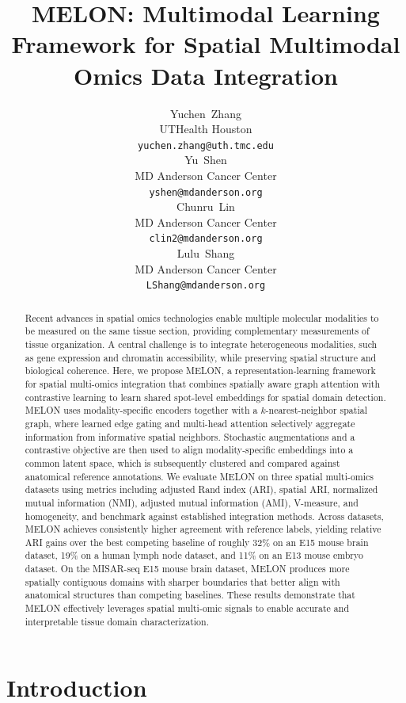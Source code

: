 \documentclass{article}
\title{MELON: Multimodal Learning Framework for Spatial Multimodal Omics Data Integration}
\author{%
  Yuchen~Zhang \\
  UTHealth Houston \\
  \texttt{yuchen.zhang@uth.tmc.edu} \\
  \And
  Yu~Shen \\
  MD Anderson Cancer Center \\
  \texttt{yshen@mdanderson.org} \\
  \AND
  Chunru~Lin \\
  MD Anderson Cancer Center \\
  \texttt{clin2@mdanderson.org} \\
  \And
  Lulu~Shang \\
  MD Anderson Cancer Center \\
  \texttt{LShang@mdanderson.org} \\
}
\theoremstyle{plain}
\theoremstyle{definition}
\begin{document}
\maketitle

\begin{abstract}
  Recent advances in spatial omics technologies enable multiple molecular modalities to be measured on the same tissue section, providing
  complementary measurements of tissue organization. A central challenge is to integrate heterogeneous modalities, such as gene expression and chromatin accessibility, while preserving spatial structure and biological coherence. Here, we propose MELON, a representation-learning framework for spatial multi-omics integration that combines spatially aware graph attention with contrastive learning to learn shared spot-level embeddings for spatial domain detection. MELON uses modality-specific encoders together with a $k$-nearest-neighbor spatial graph, where learned edge gating and multi-head attention selectively aggregate information from informative spatial neighbors. Stochastic
  augmentations and a contrastive objective are then used to align modality-specific embeddings into a common latent space, which is subsequently clustered and compared against anatomical reference annotations. We evaluate MELON on three spatial multi-omics datasets using metrics including adjusted Rand index (ARI), spatial ARI, normalized mutual
  information (NMI), adjusted mutual information (AMI), V-measure, and homogeneity, and benchmark against established integration methods. Across datasets, MELON achieves consistently higher agreement with reference labels, yielding relative ARI gains over the best competing baseline of roughly 32\% on an E15 mouse brain dataset, 19\% on a human lymph node dataset, and 11\% on an E13 mouse embryo dataset. On the MISAR-seq E15 mouse brain dataset, MELON produces more spatially contiguous domains with sharper boundaries that better align with anatomical structures than competing baselines. These results demonstrate that MELON effectively leverages spatial multi-omic signals to enable accurate and interpretable tissue domain characterization.
\end{abstract}

\section{Introduction}
\end{document}
